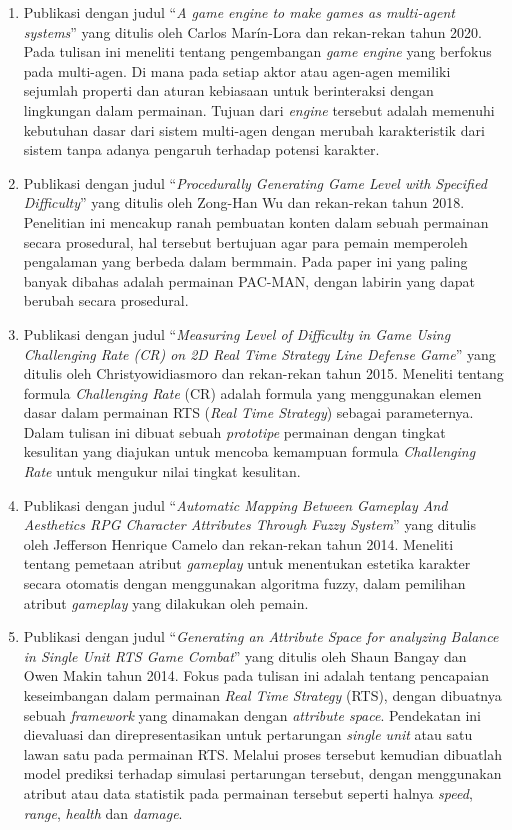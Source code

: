 \begin{enumerate}
	\item Publikasi dengan judul ``\textit{A game engine to make games as multi-agent systems}'' yang ditulis oleh Carlos Marín-Lora dan rekan-rekan tahun 2020. Pada tulisan ini meneliti tentang pengembangan \textit{game engine} yang berfokus pada multi-agen. Di mana pada setiap aktor atau agen-agen memiliki sejumlah properti dan aturan kebiasaan untuk berinteraksi dengan lingkungan dalam permainan. Tujuan dari \textit{engine} tersebut adalah memenuhi kebutuhan dasar dari sistem multi-agen dengan merubah karakteristik dari sistem tanpa adanya pengaruh terhadap potensi karakter.
	
	\item Publikasi dengan judul ``\textit{Procedurally Generating Game Level with Specified Difficulty}'' yang ditulis oleh Zong-Han Wu dan rekan-rekan tahun 2018. Penelitian ini mencakup ranah pembuatan konten dalam sebuah permainan secara prosedural, hal tersebut bertujuan agar para pemain memperoleh pengalaman yang berbeda dalam bermmain. Pada paper ini yang paling banyak dibahas adalah permainan PAC-MAN, dengan labirin yang dapat berubah secara prosedural.
	
	\item Publikasi dengan judul ``\textit{Measuring Level of Difficulty in Game Using Challenging Rate (CR) on 2D Real Time Strategy Line Defense Game}'' yang ditulis oleh Christyowidiasmoro dan rekan-rekan tahun 2015. Meneliti tentang formula \textit{Challenging Rate} (CR) adalah formula yang menggunakan elemen dasar dalam permainan RTS (\textit{Real Time Strategy}) sebagai parameternya. Dalam tulisan ini dibuat sebuah \textit{prototipe} permainan dengan tingkat kesulitan yang diajukan untuk mencoba kemampuan formula \textit{Challenging Rate} untuk mengukur nilai tingkat kesulitan.
	
	\item Publikasi dengan judul ``\textit{Automatic Mapping Between Gameplay And Aesthetics RPG Character Attributes Through Fuzzy System}'' yang ditulis oleh Jefferson Henrique Camelo dan rekan-rekan tahun 2014. Meneliti tentang pemetaan atribut \textit{gameplay} untuk menentukan estetika karakter secara otomatis dengan menggunakan algoritma fuzzy, dalam pemilihan atribut \textit{gameplay} yang dilakukan oleh pemain.
	
	\item Publikasi dengan judul ``\textit{Generating an Attribute Space for analyzing Balance in Single Unit RTS Game Combat}'' yang ditulis oleh Shaun Bangay dan Owen Makin tahun 2014. Fokus pada tulisan ini adalah tentang pencapaian keseimbangan dalam permainan \textit{Real Time Strategy} (RTS), dengan dibuatnya sebuah \textit{framework} yang dinamakan dengan \textit{attribute space}. Pendekatan ini dievaluasi dan direpresentasikan untuk pertarungan \textit{single unit} atau satu lawan satu pada permainan RTS. Melalui proses tersebut kemudian dibuatlah model prediksi terhadap simulasi pertarungan tersebut, dengan menggunakan atribut atau data statistik pada permainan tersebut seperti halnya \textit{speed}, \textit{range}, \textit{health} dan \textit{damage}.
\end{enumerate}


